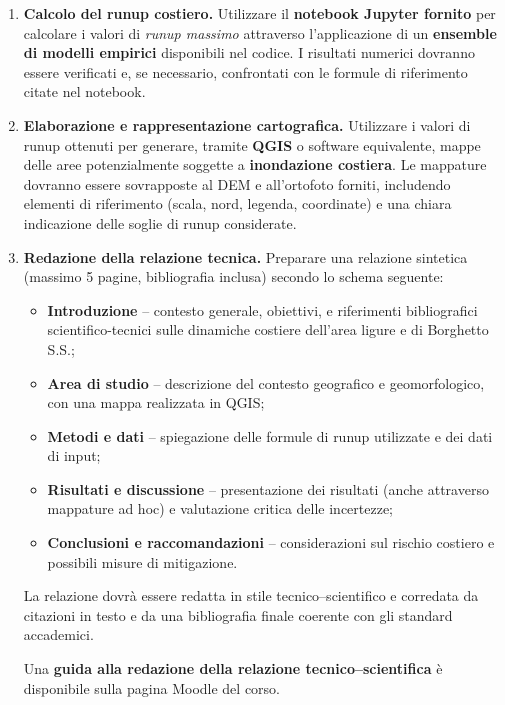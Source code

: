 \documentclass[11pt,a4paper,roman]{moderncv}
\begin{document}
\begin{enumerate}
  \item \textbf{Calcolo del runup costiero.}  
  Utilizzare il \textbf{notebook Jupyter fornito} per calcolare i valori di \textit{runup massimo} attraverso l’applicazione di un \textbf{ensemble di modelli empirici} disponibili nel codice.  
  I risultati numerici dovranno essere verificati e, se necessario, confrontati con le formule di riferimento citate nel notebook.

  \item \textbf{Elaborazione e rappresentazione cartografica.}  
  Utilizzare i valori di runup ottenuti per generare, tramite \textbf{QGIS} o software equivalente, mappe delle aree potenzialmente soggette a \textbf{inondazione costiera}.  
  Le mappature dovranno essere sovrapposte al DEM e all’ortofoto forniti, includendo elementi di riferimento (scala, nord, legenda, coordinate) e una chiara indicazione delle soglie di runup considerate.

  \item \textbf{Redazione della relazione tecnica.}  
  Preparare una relazione sintetica (massimo 5 pagine, bibliografia inclusa) secondo lo schema seguente:
  \begin{itemize}
    \item \textbf{Introduzione} – contesto generale, obiettivi, e riferimenti bibliografici scientifico-tecnici sulle dinamiche costiere dell’area ligure e di Borghetto S.S.;
    \item \textbf{Area di studio} – descrizione del contesto geografico e geomorfologico, con una mappa realizzata in QGIS;
    \item \textbf{Metodi e dati} – spiegazione delle formule di runup utilizzate e dei dati di input;
    \item \textbf{Risultati e discussione} – presentazione dei risultati (anche attraverso mappature ad hoc) e valutazione critica delle incertezze;
    \item \textbf{Conclusioni e raccomandazioni} – considerazioni sul rischio costiero e possibili misure di mitigazione.
  \end{itemize}
  La relazione dovrà essere redatta in stile tecnico–scientifico e corredata da citazioni in testo e da una bibliografia finale coerente con gli standard accademici.  

  Una \textbf{guida alla redazione della relazione tecnico–scientifica} è disponibile sulla pagina Moodle del corso.
\end{enumerate}
\end{document}
